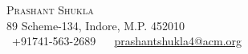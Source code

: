 \documentclass[12pt]{article}
\begin{document}
\begin{center}
    {\Huge \scshape Prashant Shukla} \\ \vspace{5pt}
    89 Scheme-134, Indore, M.P. 452010 \\ \vspace{3pt}
    \small \faPhone\ +91741-563-2689 ~ \href{mailto:x@gmail.com} \faEnvelope\  \underline{prashantshukla4@acm.org} ~

\end{center}
\end{document}

